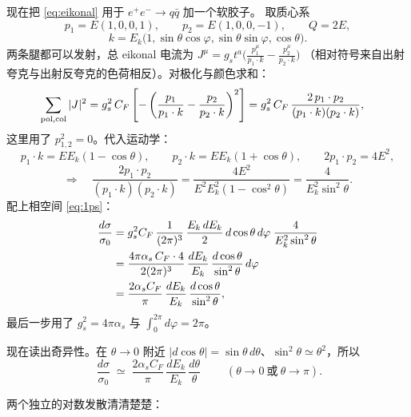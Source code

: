 \documentclass[UTF8,a4paper,11pt]{ctexart}
\theoremstyle{definition}
\theoremstyle{remark}
\theoremstyle{plain}
\newcommand{\as}{\alpha_s}
\newcommand{\CF}{C_F}
\begin{document}
现在把 \eqref{eq:eikonal} 用于 $e^+e^-\to q\bar q$ 加一个软胶子。
取质心系
\begin{equation}
  p_1=E(1,0,0,1),\qquad p_2=E(1,0,0,-1),\qquad Q=2E ,
\end{equation}
\begin{equation}
  k=E_k\big(1,\sin\theta\cos\varphi,\sin\theta\sin\varphi,\cos\theta\big).
\end{equation}
两条腿都可以发射，总 eikonal 电流为
$J^\mu=g_st^a\big(\frac{p_1^\mu}{p_1\cdot k}-\frac{p_2^\mu}{p_2\cdot k}\big)$
（相对符号来自出射夸克与出射反夸克的色荷相反）。对极化与颜色求和：
\begin{align}
  \sum_{\rm pol,col}|J|^2
  &= g_s^2\,\CF\left[-\left(\frac{p_1}{p_1\cdot k}-\frac{p_2}{p_2\cdot k}\right)^2\right]
   = g_s^2\,\CF\,\frac{2\,p_1\cdot p_2}{(p_1\cdot k)(p_2\cdot k)} ,
  \label{eq:eiksq}
\end{align}
这里用了 $p_{1,2}^2=0$。代入运动学：
\begin{equation}
  p_1\cdot k=E E_k(1-\cos\theta),\qquad
  p_2\cdot k=E E_k(1+\cos\theta),\qquad
  2p_1\cdot p_2=4E^2 ,
\end{equation}
\begin{equation}
  \Rightarrow\quad
  \frac{2p_1\cdot p_2}{(p_1\cdot k)(p_2\cdot k)}
  =\frac{4E^2}{E^2E_k^2(1-\cos^2\theta)}
  =\frac{4}{E_k^2\sin^2\theta} .
\end{equation}
配上相空间 \eqref{eq:1ps}：
\begin{align}
  \frac{d\sigma}{\sigma_0}
  &= g_s^2\CF\,\frac{1}{(2\pi)^3}\,\frac{E_k\,dE_k}{2}\,
     d\cos\theta\, d\varphi\;\frac{4}{E_k^2\sin^2\theta}
   \notag\\
  &= \frac{4\pi\as\,\CF\cdot 4}{2(2\pi)^3}\,
     \frac{dE_k}{E_k}\,\frac{d\cos\theta}{\sin^2\theta}\,d\varphi
   \notag\\
  &= \frac{2\as\CF}{\pi}\,\frac{dE_k}{E_k}\,
     \frac{d\cos\theta}{\sin^2\theta} ,
  \label{eq:softdist}
\end{align}
最后一步用了 $g_s^2=4\pi\as$ 与 $\int_0^{2\pi}d\varphi=2\pi$。

现在读出奇异性。在 $\theta\to0$ 附近
$|d\cos\theta|=\sin\theta\,d\theta$、$\sin^2\theta\simeq\theta^2$，所以
\begin{equation}
  \boxed{\;
  \frac{d\sigma}{\sigma_0}\;\simeq\;
  \frac{2\as\CF}{\pi}\,\frac{dE_k}{E_k}\,\frac{d\theta}{\theta}\;}
  \qquad(\theta\to0\ \text{或}\ \theta\to\pi).
  \label{eq:doublelogdiff}
\end{equation}

两个独立的对数发散清清楚楚：
\end{document}
